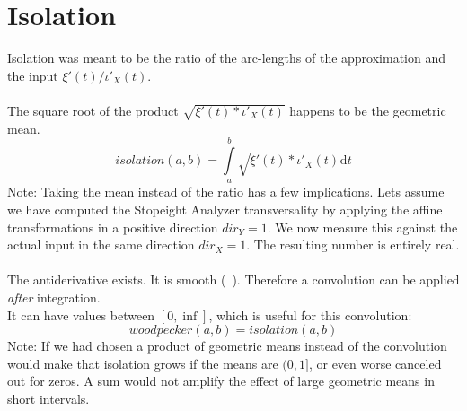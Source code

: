 \documentclass{report}
\begin{document}
\chapter{Isolation}
Isolation was meant to be the ratio of the arc-lengths of the approximation and the input $\xi'(t)/\iota'_{X}(t)$.\\\\
The square root of the product $\sqrt{\xi'(t)*\iota'_{X}(t)}$ happens to be the geometric mean.
\begin{equation}
isolation(a,b)=\int \limits _{a}^{b} \sqrt{\xi'(t)*\iota'_{X}(t)} \mathrm{d}t
\end{equation}
Note: Taking the mean instead of the ratio has a few implications. Lets assume we have computed the Stopeight Analyzer transversality by applying the affine transformations in a positive direction $dir_{Y}=1$. We now measure this against the actual input in the same direction $dir_{X}=1$. The resulting number is entirely real.\\\\
The antiderivative exists. It is smooth (~\cite[Riemann Integrable]{Widon}). Therefore a convolution can be applied \emph{after} integration.\\
It can have values between $[0,\inf]$, which is useful for this convolution:\\
\begin{equation}
woodpecker(a,b)=isolation(a,b)
\end{equation}
Note: If we had chosen a product of geometric means instead of the convolution would make that isolation grows if the means are $(0,1]$, or even worse canceled out for zeros. A sum would not amplify the effect of large geometric means in short intervals.
\end{document}
